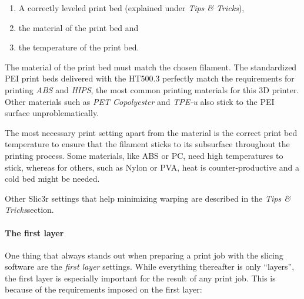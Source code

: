 \begin{enumerate}
  \item A correctly leveled print bed (explained under \emph{Tips \& Tricks}), 
  \item the material of the print bed and 
  \item the temperature of the print bed. 
\end{enumerate}

The material of the print bed must match the chosen filament. The standardized PEI print beds delivered with the HT500.3 perfectly match the requirements for printing \emph{ABS} and 
\emph{HIPS}, the most common printing materials for this 3D printer. Other materials such as 
\emph{PET Copolyester} and \emph{TPE-u} also stick to the PEI surface unproblematically.

The most necessary print setting apart from the material is the correct print bed temperature to ensure that the filament sticks to its subsurface throughout the printing process. Some materials, like ABS or PC, need high temperatures to stick, whereas for others, such as Nylon or PVA, heat is counter-productive and a cold bed might be needed.

Other Slic3r settings that help minimizing warping are described in the \emph{Tips \& Tricks}section. 

\paragraph{The first layer}

One thing that always stands out when preparing a print job with the slicing software are the \emph{first layer} settings. While everything thereafter is only “layers”, the first layer is especially important for the result of any print job.
This is because of the requirements imposed on the first layer: 

